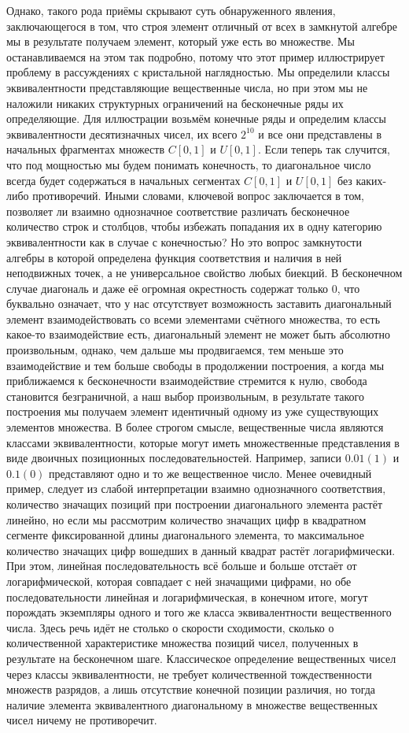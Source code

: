 \documentclass[12pt]{article}
\begin{document}
Однако, такого рода приёмы скрывают суть обнаруженного явления, заключающегося в том, что строя элемент отличный от всех в замкнутой алгебре мы в результате получаем элемент, который уже есть во множестве. Мы останавливаемся на этом так подробно, потому что этот пример иллюстрирует проблему в рассуждениях с кристальной наглядностью. Мы определили классы эквивалентности представляющие вещественные числа, но при этом мы не наложили никаких структурных ограничений на бесконечные ряды их определяющие. Для иллюстрации возьмём конечные ряды и определим классы эквивалентности десятизначных чисел, их всего $2^{10}$ и все они представлены в начальных фрагментах множеств $C[0, 1]$ и $U[0, 1]$. Если теперь так случится, что под мощностью мы будем понимать конечность, то диагональное число всегда будет содержаться в начальных сегментах $C[0, 1]$ и $U[0, 1]$ без каких-либо противоречий. Иными словами, ключевой вопрос заключается в том, позволяет ли взаимно однозначное соответствие различать бесконечное количество строк и столбцов, чтобы избежать попадания их в одну категорию эквивалентности как в случае с конечностью? Но это вопрос замкнутости алгебры в которой определена функция соответствия и наличия в ней неподвижных точек, а не универсальное свойство любых биекций. В бесконечном случае диагональ и даже её огромная окрестность содержат только $0$, что буквально означает, что у нас отсутствует возможность заставить диагональный элемент взаимодействовать со всеми элементами счётного множества, то есть какое-то взаимодействие есть, диагональный элемент не может быть абсолютно произвольным, однако, чем дальше мы продвигаемся, тем меньше это взаимодействие и тем больше свободы в продолжении построения, а когда мы приближаемся к бесконечности взаимодействие стремится к нулю, свобода становится безграничной, а наш выбор произвольным, в результате такого построения мы получаем элемент идентичный одному из уже существующих элементов множества. В более строгом смысле, вещественные числа являются классами эквивалентности, которые могут иметь множественные представления в виде двоичных позиционных последовательностей. Например, записи $0.01(1)$ и $0.1(0)$ представляют одно и то же вещественное число. Менее очевидный пример, следует из слабой интерпретации взаимно однозначного соответствия, количество значащих позиций при построении диагонального элемента растёт линейно, но если мы рассмотрим количество значащих цифр в квадратном сегменте фиксированной длины диагонального элемента, то максимальное количество значащих цифр вошедших в данный квадрат растёт логарифмически. При этом, линейная последовательность всё больше и больше отстаёт от логарифмической, которая совпадает с ней значащими цифрами, но обе последовательности линейная и логарифмическая, в конечном итоге, могут порождать экземпляры одного и того же класса эквивалентности вещественного числа. Здесь речь идёт не столько о скорости сходимости, сколько о количественной характеристике множества позиций чисел, полученных в результате на бесконечном шаге. Классическое определение вещественных чисел через классы эквивалентности, не требует количественной тождественности множеств разрядов, а лишь отсутствие конечной позиции различия, но тогда наличие элемента эквивалентного диагональному в множестве вещественных чисел ничему не противоречит. 
\end{document}

